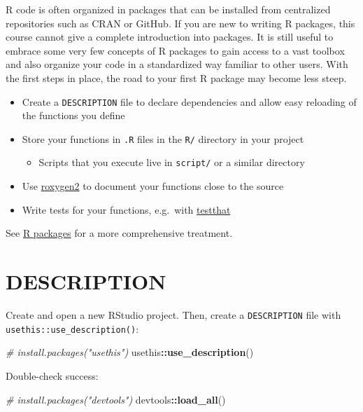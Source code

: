 \documentclass[]{book}
\newenvironment{Shaded}{\begin{snugshade}}{\end{snugshade}}
\newcommand{\CommentTok}[1]{\textcolor[rgb]{0.56,0.35,0.01}{\textit{#1}}}
\newcommand{\KeywordTok}[1]{\textcolor[rgb]{0.13,0.29,0.53}{\textbf{#1}}}
\newcommand{\NormalTok}[1]{#1}
\newcommand{\OperatorTok}[1]{\textcolor[rgb]{0.81,0.36,0.00}{\textbf{#1}}}
\providecommand{\tightlist}{%
  \setlength{\itemsep}{0pt}\setlength{\parskip}{0pt}}
\begin{document}
R code is often organized in packages that can be installed from centralized repositories such as CRAN or GitHub.
If you are new to writing R packages, this course cannot give a complete introduction into packages.
It is still useful to embrace some very few concepts of R packages to gain access to a vast toolbox and also organize your code in a standardized way familiar to other users.
With the first steps in place, the road to your first R package may become less steep.

\begin{itemize}
\tightlist
\item
  Create a \texttt{DESCRIPTION} file to declare dependencies and allow easy reloading of the functions you define
\item
  Store your functions in \texttt{.R} files in the \texttt{R/} directory in your project

  \begin{itemize}
  \tightlist
  \item
    Scripts that you execute live in \texttt{script/} or a similar directory
  \end{itemize}
\item
  Use \href{https://github.com/klutometis/roxygen}{roxygen2} to document your functions close to the source
\item
  Write tests for your functions, e.g.~with \href{https://testthat.r-lib.org/}{testthat}
\end{itemize}

See \href{http://r-pkgs.had.co.nz/}{R packages} for a more comprehensive treatment.

\hypertarget{description}{%
\section{DESCRIPTION}\label{description}}

Create and open a new RStudio project.
Then, create a \texttt{DESCRIPTION} file with \texttt{usethis::use\_description()}:

\begin{Shaded}
\begin{Highlighting}[]
\CommentTok{# install.packages("usethis")}
\NormalTok{usethis}\OperatorTok{::}\KeywordTok{use_description}\NormalTok{()}
\end{Highlighting}
\end{Shaded}

Double-check success:

\begin{Shaded}
\begin{Highlighting}[]
\CommentTok{# install.packages("devtools")}
\NormalTok{devtools}\OperatorTok{::}\KeywordTok{load_all}\NormalTok{()}
\end{Highlighting}
\end{Shaded}
\end{document}
